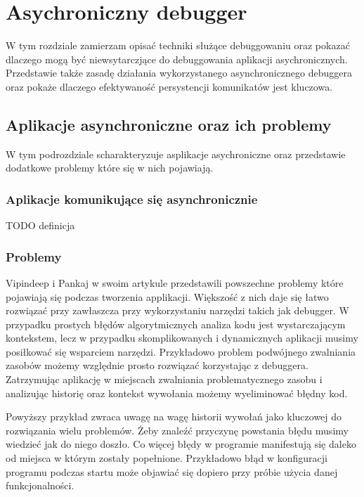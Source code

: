 \chapter{Asychroniczny debugger}

W tym rozdziale zamierzam opisać techniki służące debuggowaniu oraz pokazać dlaczego mogą być niewsytarczjące do debuggowania aplikacji asychronicznych. Przedstawie także zasadę działania wykorzystanego asynchronicznego debuggera oraz pokaże dlaczego efektywaność persystencji komunikatów jest kluczowa.

\section{Aplikacje asynchroniczne oraz ich problemy}

W tym podrozdziale scharakteryzuje asplikacje asychroniczne oraz przedstawie dodatkowe problemy które się w nich pojawiają.

\subsection{Aplikacje komunikujące się asynchronicznie}

TODO definicja

\subsection{Problemy}
Vipindeep i Pankaj w swoim artykule \cite{commonBugs} przedstawili powszechne problemy które pojawiają się podczas tworzenia applikacji. Większość z nich daje się łatwo rozwiązać przy zawłaszcza przy wykorzystaniu narzędzi takich jak debugger. W przypadku prostych błędów algorytmicznych analiza kodu jest wystarczającym kontekstem, lecz w przypadku skomplikowanych i dynamicznych aplikacji musimy posiłkować się wsparciem narzędzi. Przykładowo problem podwójnego zwalniania zasobów możemy względnie prosto rozwiązać korzystając z debuggera. Zatrzymując aplikację w miejscach zwalniania problematycznego zasobu i analizując historię oraz kontekst wywołania możemy wyeliminować błędny kod.

Powyższy przykład zwraca uwagę na wagę historii wywołań jako kluczowej do rozwiązania wielu problemów. Żeby znaleźć przyczynę powstania błędu musimy wiedzieć jak do niego doszło. Co więcej błędy w programie manifestują się daleko od miejsca w którym zostały popełnione. Przykładowo błąd w konfiguracji programu podczas startu może objawiać się dopiero przy próbie użycia danej funkcjonalności.

